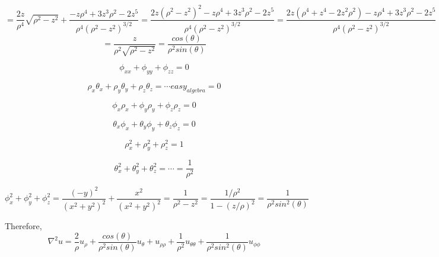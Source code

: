 \documentclass{article}
\begin{document}
\begin{equation*}
  = \frac{2z}{\rho^4} \sqrt{\rho^2 - z^2} + \frac{-z\rho^4 + 3z^3 \rho^2 - 2z^5}{\rho^4 (\rho^2 - z^2)^{3/2}} = \frac{2z(\rho^2 - z^2)^2 - z\rho^4 + 3z^3 \rho^2 - 2z^5}{\rho^4 (\rho^2 - z^2)^{3/2}} = \frac{2z(\rho^4 + z^4 - 2z^2\rho^2) - z\rho^4 + 3z^3 \rho^2 - 2z^5}{\rho^4 (\rho^2 - z^2)^{3/2}}
\end{equation*}
\begin{equation*}
  = \frac{ z }{\rho^2 \sqrt{\rho^2 - z^2}} = \frac{cos(\theta)}{\rho^2sin(\theta)}
\end{equation*}

\begin{equation*}
  \phi_{xx} + \phi_{yy} + \phi_{zz} = 0
\end{equation*}

\begin{equation*}
  \rho_x \theta_x +\rho_y \theta_y+ \rho_z \theta_z = \cdots easy_{algebra} = 0
\end{equation*}

\begin{equation*}
  \phi_x \rho_x + \phi_y \rho_y + \phi_z \rho_z = 0
\end{equation*}

\begin{equation*}
  \theta_x \phi_x + \theta_y \phi_y + \theta_z \phi_z = 0  
\end{equation*}

\begin{equation*}
  \rho_x^2 + \rho_y^2 + \rho_z^2 = 1
\end{equation*}

\begin{equation*}
  \theta_x^2 + \theta_y^2 + \theta_z^2 = \cdots = \frac{1}{\rho^2}
\end{equation*}

\begin{equation*}
  \phi_x^2 + \phi_y^2 + \phi_z^2 = \frac{(-y)^2}{(x^2+y^2)^2} + \frac{x^2}{(x^2+y^2)^2} = \frac{1}{\rho^2 - z^2} = \frac{1/\rho^2}{1 - (z/\rho)^2} = \frac{1}{\rho^2sin^2(\theta)}
\end{equation*}

Therefore,
\begin{equation*}
  \nabla^2 u = \frac{2}{\rho} u_\rho + \frac{cos(\theta)} {\rho^2sin(\theta)} u_\theta + u_{\rho \rho} + \frac{1}{\rho^2} u_{\theta \theta} + \frac{1}{\rho^2sin^2(\theta)} u_{\phi \phi}
\end{equation*}
\end{document}
